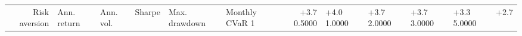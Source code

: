 \begin{tabular}{rllrllrl}
\toprule
Risk aversion & Ann. return & Ann. vol. & Sharpe & Max. drawdown & Monthly CVaR 1%
 & +3.7%
0.5000 & +4.0%
1.0000 & +3.7%
2.0000 & +3.7%
3.0000 & +3.3%
5.0000 & +2.7%
\bottomrule
\end{tabular}
